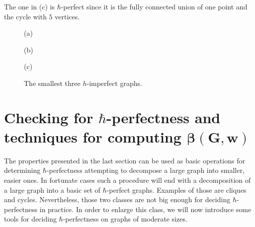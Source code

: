 \documentclass[
12pt,
prx,
aps,
reprint,
a4paper,
longbibliograph,
nofootinbib,
nobibnotes,
superscriptaddress
]{revtex4-2}
\theoremstyle{definition}
\begin{document}
The one in (c) is $\hbar$-perfect since it is the fully connected union of one point and the cycle with $5$ vertices.
\begin{figure}[htpb]
	\centering
(a)
(b)
(c)
	\caption{The smallest three $h$-imperfect  graphs.}
	\label{fig:himperfect}
\end{figure}





\section{\texorpdfstring{Checking for $\mathbf{\hbar}$-perfectness and techniques for computing  $\mathbf{\beta(G,w)}$}{}}
\label{sec:numerical}
The properties presented in the last section can be used as basic operations for determining $\hbar$-perfectness attempting to  decompose  a large graph into smaller, easier ones. In fortunate cases such a procedure will end with a decomposition of a large graph into a basic set of $\hbar$-perfect graphs. 
Examples of those are 
cliques and cycles. Nevertheless, those two classes are not big  enough for deciding 
$\hbar$-perfectness in practice. In order to enlarge this class, we will now introduce some tools for deciding $\hbar$-perfectness on graphs of moderate sizes. 
\end{document}
